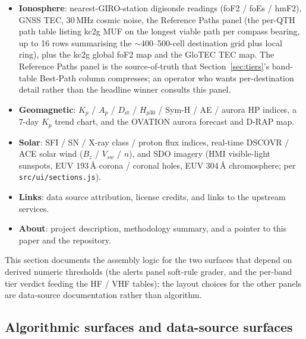 \documentclass[11pt,a4paper]{article}
\begin{document}
\begin{itemize}[nosep]
        R/S/G probability table, the SWPC 3-h $K_p$ forecast,
        Earth-directed CMEs from NASA DONKI, IMO-catalogue meteor
        showers, top active solar regions, and the 27-day
        ISES SFI / $A_p$ outlook.
  \item \textbf{Ionosphere}: nearest-GIRO-station digisonde
        readings (foF2 / foEs / hmF2), GNSS TEC, 30\,MHz cosmic
        noise, the Reference Paths panel (the per-QTH path
        table listing kc2g MUF on the longest viable path per
        compass bearing, up to 16 rows summarising the
        ${\sim}$400--500-cell destination grid plus local ring),
        plus the kc2g global foF2 map and the GloTEC TEC map.
        The Reference Paths panel is the source-of-truth that
        Section~\ref{sec:tiers}'s band-table Best-Path column
        compresses; an operator who wants per-destination detail
        rather than the headline winner consults this panel.
  \item \textbf{Geomagnetic}: $K_p$ / $A_p$ / $D_{\text{st}}$ /
        $H_{p30}$ / Sym-H / AE / aurora HP indices, a 7-day
        $K_p$ trend chart, and the OVATION aurora forecast and
        D-RAP map.
  \item \textbf{Solar}: SFI / SN / X-ray class / proton flux
        indices, real-time DSCOVR / ACE solar wind ($B_z$ /
        $V_{sw}$ / $n$), and SDO imagery (HMI visible-light
        sunspots, EUV 193\,\AA{} corona / coronal holes, EUV
        304\,\AA{} chromosphere; per
        \texttt{src/ui/sections.js}).
  \item \textbf{Links}: data source attribution, license credits,
        and links to the upstream services.
  \item \textbf{About}: project description, methodology summary,
        and a pointer to this paper and the repository.
\end{itemize}

This section documents the assembly logic for the two surfaces
that depend on derived numeric thresholds (the alerts panel
soft-rule grader, and the per-band tier verdict feeding the HF /
VHF tables); the layout choices for the other panels are
data-source documentation rather than algorithm.

\subsection{Algorithmic surfaces and data-source surfaces}
\end{document}
